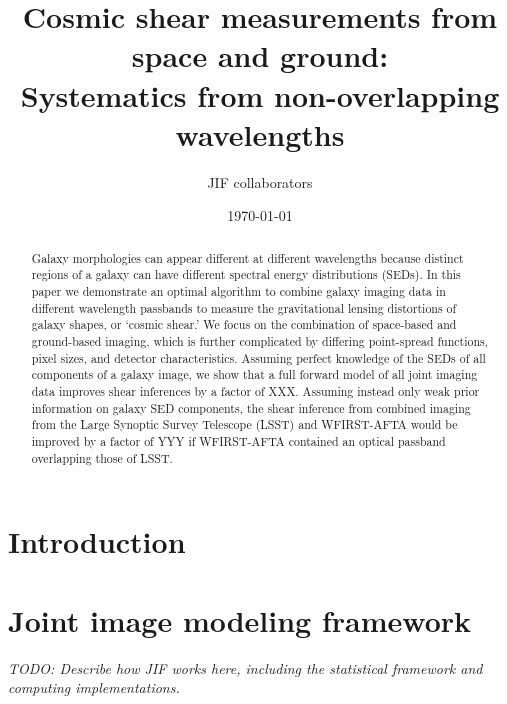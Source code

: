 \documentclass[11pt, letterpaper]{article}
\begin{document}
  
\title{Cosmic shear measurements from space and ground: \\Systematics from non-overlapping wavelengths}

\author{JIF collaborators}

\date{\today}

\maketitle
\tableofcontents

\begin{abstract}
	Galaxy morphologies can appear different at different wavelengths because distinct regions of 
	a galaxy can have different spectral energy distributions (SEDs). In this paper we demonstrate an 
	optimal algorithm to combine galaxy imaging data in different wavelength passbands to measure 
	the gravitational lensing distortions of galaxy shapes, or `cosmic shear.'
	We focus on the combination of space-based and ground-based imaging, which is
	further complicated by differing point-spread functions, pixel sizes, and detector characteristics.
	Assuming perfect knowledge of the SEDs of all components of a galaxy image, we show that a 
	full forward model of all joint imaging data improves shear inferences by a factor of XXX. 
	Assuming instead only weak prior information on galaxy SED components, the shear inference from 
	combined imaging from the Large Synoptic Survey Telescope (LSST) and WFIRST-AFTA would be improved 
	by a factor of YYY if WFIRST-AFTA contained an optical passband overlapping those of LSST.
\end{abstract}

\section{Introduction} %
\label{sec:introduction}



\section{Joint image modeling framework} %
\label{sec:joint_image_modeling_framework}
{\it TODO: Describe how JIF works here, including the statistical framework and 
computing implementations.}
\end{document}
